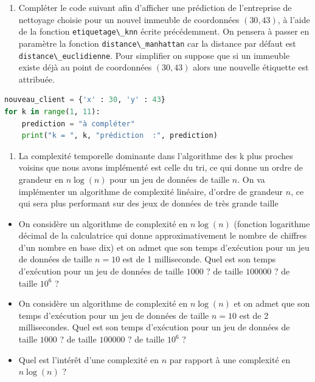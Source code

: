 \documentclass[
  11pt,
]{article}
\newcommand{\passthrough}[1]{#1}
\providecommand{\tightlist}{%
  \setlength{\itemsep}{0pt}\setlength{\parskip}{0pt}}
\newcounter{thme}
\newcounter{def}
\newcounter{alg}
\begin{document}
\begin{enumerate}
\def\labelenumi{\arabic{enumi}.}
\setcounter{enumi}{2}
\tightlist
\item
  Compléter le code suivant afin d'afficher une prédiction de
  l'entreprise de nettoyage choisie pour un nouvel immeuble de
  coordonnées \((30, 43)\), à l'aide de la fonction
  \passthrough{\lstinline!etiquetage\_knn!} écrite précédemment. On
  pensera à passer en paramètre la fonction
  \passthrough{\lstinline!distance\_manhattan!} car la distance par
  défaut est \passthrough{\lstinline!distance\_euclidienne!}. Pour
  simplifier on suppose que si un immeuble existe déjà au point de
  coordonnées \((30, 43)\) alors une nouvelle étiquette est attribuée.
\end{enumerate}

\begin{lstlisting}[language=Python]
nouveau_client = {'x' : 30, 'y' : 43}
for k in range(1, 11):
    prediction = "à compléter"
    print("k = ", k, "prédiction  :", prediction)
\end{lstlisting}

\begin{enumerate}
\def\labelenumi{\arabic{enumi}.}
\setcounter{enumi}{3}
\tightlist
\item
  La complexité temporelle dominante dans l'algorithme des k plus
  proches voisins que nous avons implémenté est celle du tri, ce qui
  donne un ordre de grandeur en \(n \log(n)\) pour un jeu de données de
  taille \(n\). On va implémenter un algorithme de complexité linéaire,
  d'ordre de grandeur \(n\), ce qui sera plus performant sur des jeux de
  données de très grande taille
\end{enumerate}

\begin{itemize}
\tightlist
\item
  On considère un algorithme de complexité en \(n \log(n)\) (fonction
  logarithme décimal de la calculatrice qui donne approximativement le
  nombre de chiffres d'un nombre en base dix) et on admet que son temps
  d'exécution pour un jeu de données de taille \(n=10\) est de 1
  milliseconde. Quel est son temps d'exécution pour un jeu de données de
  taille \(1000\) ? de taille \(100000\) ? de taille \(10^{6}\) ?
\item
  On considère un algorithme de complexité en \(n \log(n)\) et on admet
  que son temps d'exécution pour un jeu de données de taille \(n=10\)
  est de 2 millisecondes. Quel est son temps d'exécution pour un jeu de
  données de taille \(1000\) ? de taille \(100000\) ? de taille
  \(10^{6}\) ?
\item
  Quel est l'intérêt d'une complexité en \(n\) par rapport à une
  complexité en \(n \log(n)\) ?
\end{itemize}
\end{document}
